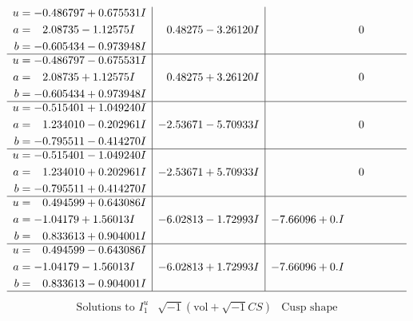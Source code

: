 \documentclass[1p]{elsarticle_modified}
\theoremstyle{definition}
\newcommand{\I}{\sqrt{-1}}
\begin{document}
$$\begin{array}{c|c|c}
\begin{aligned}
u &= -0.486797 + 0.675531 I \\
a &= \phantom{-}2.08735 - 1.12575 I \\
b &= -0.605434 - 0.973948 I\end{aligned}
 & \phantom{-}0.48275 - 3.26120 I & \phantom{-0.000000 } 0 \\ \hline\begin{aligned}
u &= -0.486797 - 0.675531 I \\
a &= \phantom{-}2.08735 + 1.12575 I \\
b &= -0.605434 + 0.973948 I\end{aligned}
 & \phantom{-}0.48275 + 3.26120 I & \phantom{-0.000000 } 0 \\ \hline\begin{aligned}
u &= -0.515401 + 1.049240 I \\
a &= \phantom{-}1.234010 - 0.202961 I \\
b &= -0.795511 - 0.414270 I\end{aligned}
 & -2.53671 - 5.70933 I & \phantom{-0.000000 } 0 \\ \hline\begin{aligned}
u &= -0.515401 - 1.049240 I \\
a &= \phantom{-}1.234010 + 0.202961 I \\
b &= -0.795511 + 0.414270 I\end{aligned}
 & -2.53671 + 5.70933 I & \phantom{-0.000000 } 0 \\ \hline\begin{aligned}
u &= \phantom{-}0.494599 + 0.643086 I \\
a &= -1.04179 + 1.56013 I \\
b &= \phantom{-}0.833613 + 0.904001 I\end{aligned}
 & -6.02813 - 1.72993 I & -7.66096 + 0. I\phantom{ +0.000000I} \\ \hline\begin{aligned}
u &= \phantom{-}0.494599 - 0.643086 I \\
a &= -1.04179 - 1.56013 I \\
b &= \phantom{-}0.833613 - 0.904001 I\end{aligned}
 & -6.02813 + 1.72993 I & -7.66096 + 0. I\phantom{ +0.000000I}\\
 \hline 
 \end{array}$$\newpage$$\begin{array}{c|c|c}  
\text{Solutions to }I^u_{1}& \I (\text{vol} + \sqrt{-1}CS) & \text{Cusp shape}\\
 \hline 
\begin{aligned}

\end{aligned}
\end{array}$$
\end{document}
